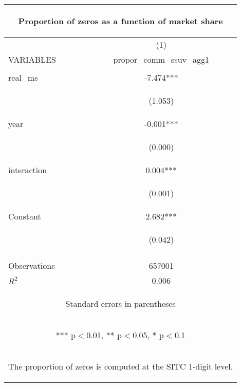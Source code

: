 \begin{center}
\begin{tabular}{lc}
\multicolumn{2}{c}{\begin{large}Proportion of zeros as a function of market share\end{large}} \\ \hline
 & (1) \\
VARIABLES & propor\_comm\_ssuv\_agg1 \\ \hline
\vspace{4pt} & \begin{footnotesize}\end{footnotesize} \\
real\_ms & -7.474*** \\
\vspace{4pt} & \begin{footnotesize}(1.053)\end{footnotesize} \\
year & -0.001*** \\
\vspace{4pt} & \begin{footnotesize}(0.000)\end{footnotesize} \\
interaction & 0.004*** \\
\vspace{4pt} & \begin{footnotesize}(0.001)\end{footnotesize} \\
Constant & 2.682*** \\
 & \begin{footnotesize}(0.042)\end{footnotesize} \\
\vspace{4pt} & \begin{footnotesize}\end{footnotesize} \\
Observations & 657001 \\
 $R^2$ & 0.006 \\ \hline
\multicolumn{2}{c}{\begin{footnotesize} Standard errors in parentheses\end{footnotesize}} \\
\multicolumn{2}{c}{\begin{footnotesize} *** p$<$0.01, ** p$<$0.05, * p$<$0.1\end{footnotesize}} \\
\multicolumn{2}{c}{\begin{footnotesize} The proportion of zeros is computed at the SITC 1-digit level.\end{footnotesize}} \\
\end{tabular}
\end{center}
